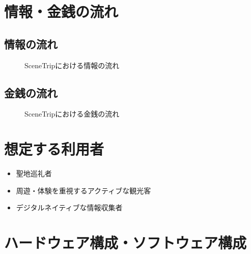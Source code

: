 \documentclass[a4j, 11pt, report]{jsarticle}
\begin{document}
\section{情報・金銭の流れ}
\subsection{情報の流れ}
\begin{figure}[H]
    \centering
    \caption{SceneTripにおける情報の流れ}
    \label{fig:info}
\end{figure}

\subsection{金銭の流れ}
\begin{figure}[H]
    \centering
    \caption{SceneTripにおける金銭の流れ}
    \label{fig:money}
\end{figure}


\section{想定する利用者}
\begin{itemize}
    \item 聖地巡礼者
    \item 周遊・体験を重視するアクティブな観光客
    \item デジタルネイティブな情報収集者
\end{itemize}

\section{ハードウェア構成・ソフトウェア構成}
\end{document}
